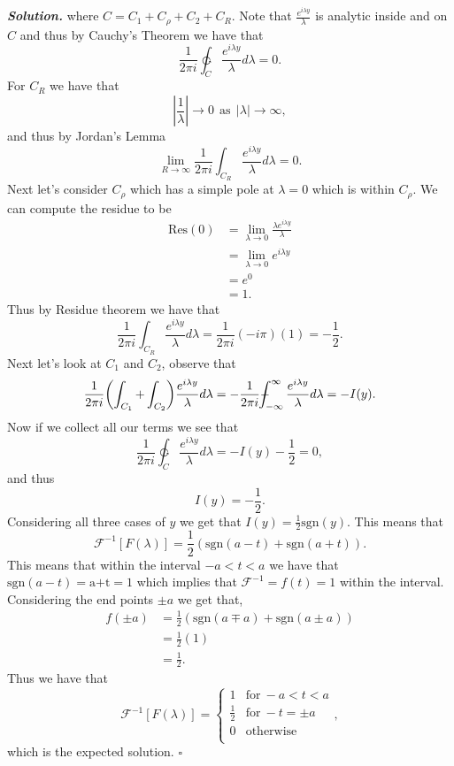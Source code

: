 \documentclass[12pt]{report}
\newenvironment{solution}[1][\it{Solution}]{\textbf{#1. } }{$\square$}
\def\F{{\mathcal{F}}}
\newcommand{\paren}[1]{{\left(#1\right)}} %
\newcommand{\abs}[1]{{\left|#1\right|}} %
\def\ointcc{{\ointctrclockwise}} %
\def\Xint#1{\mathchoice
   {\XXint\displaystyle\textstyle{#1}}%
   {\XXint\textstyle\scriptstyle{#1}}%
   {\XXint\scriptstyle\scriptscriptstyle{#1}}%
   {\XXint\scriptscriptstyle\scriptscriptstyle{#1}}%
   \!\int}
\def\XXint#1#2#3{{\setbox0=\hbox{$#1{#2#3}{\int}$}
     \vcenter{\hbox{$#2#3$}}\kern-.5\wd0}}
\def\dashint{\Xint-}
\begin{document}
\begin{solution}
    where $C = C_1 + C_\rho + C_2 + C_R$. Note that $\frac{e^{i \lambda y}}{\lambda}$ is analytic inside and on $C$ and thus by Cauchy's Theorem we have that
    \[ \frac{1}{2\pi i} \ointcc_{C} \frac{e^{i\lambda y}}{\lambda} d\lambda = 0.\]
    For $C_R$ we have that
    \[ \abs{\frac{1}{\lambda}} \to 0 ~~\text{as}~~ \abs{\lambda} \to \infty,\]
    and thus by Jordan's Lemma
    \[\lim_{R \to \infty} \frac{1}{2\pi i} \int_{C_R} \frac{e^{i\lambda y}}{\lambda} d\lambda = 0.\]
    Next let's consider $C_\rho$ which has a simple pole at $\lambda = 0$ which is within $C_\rho$. We can compute the residue to be
    \begin{align*}
        \text{Res}(0) &= \lim_{\lambda \to 0}\frac{\lambda e^{i\lambda y}}{\lambda}\\
        &= \lim_{\lambda \to 0}e^{i\lambda y}\\
        &= e^0\\
        &= 1.
    \end{align*}
    Thus by Residue theorem we have that
    \[
        \frac{1}{2\pi i} \int_{C_R} \frac{e^{i\lambda y}}{\lambda} d\lambda = \frac{1}{2\pi i}(-i \pi)(1) = - \frac{1}{2}.
    \]
    Next let's look at $C_1$ and $C_2$, observe that
    \[ \frac{1}{2\pi i}\paren{\int_{C_1} + \int_{C_2}}\frac{e^{i \lambda y}}{\lambda}d\lambda = -\frac{1}{2\pi i}\dashint_{-\infty}^{\infty}\frac{e^{i \lambda y}}{\lambda}d\lambda = -I(y).\]
    Now if we collect all our terms we see that
    \[\frac{1}{2\pi i} \ointcc_{C} \frac{e^{i\lambda y}}{\lambda} d\lambda = -I(y) - \frac{1}{2}  = 0,\]
    and thus 
    \[ I(y) = -\frac{1}{2}.\]
    Considering all three cases of $y$ we get that $I(y) = \frac{1}{2}\text{sgn}(y)$. This means that
    \[ \F^{-1}[F(\lambda)] = \frac{1}{2}\paren{\text{sgn}(a -t) + \text{sgn}(a+t)}.\]
    This means that within the interval $-a < t < a$ we have that $\text{sgn}(a-t)=\text{a+t} = 1$ which implies that $\F^{-1} = f(t) = 1$ within the interval. Considering the end points $\pm a$ we get that,
    \begin{align*}
        f(\pm a) &= \frac{1}{2}\paren{\text{sgn}(a \mp a) + \text{sgn}(a \pm a)}\\
        &=\frac{1}{2}(1)\\
        &= \frac{1}{2}.
    \end{align*}
    Thus we have that
    \[ \F^{-1}[F(\lambda)] = 
    \begin{cases}
    1 &\text{for} ~ -a < t < a\\
    \frac{1}{2} &\text{for} ~ - t = \pm a\\
    0 &\text{otherwise}\\
    \end{cases},
    \]
    which is the expected solution. 
\end{solution}
\end{document}
